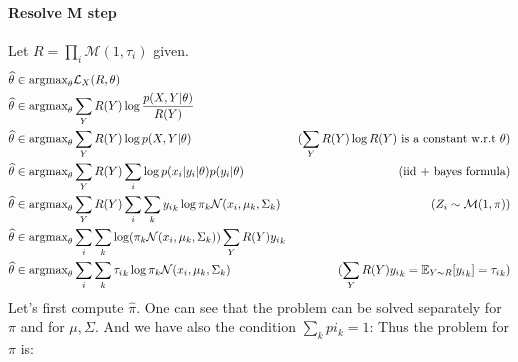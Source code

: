 \documentclass{article}
\begin{document}
\paragraph{Resolve M step} Let $R = \prod_i \mathcal{M}(1, \tau_i)$ given.\vspace{10px}
\begin{equation*}
    \begin{aligned}
        \widehat\theta & \in \text{argmax}_{\theta} \mathcal{L}_X(R, \theta)                                                      &                                                              \\
        \widehat\theta & \in \text{argmax}_{\theta} \sum_Y R(Y) \log \frac{p(X, Y | \theta)}{R(Y)}                                &                                                              \\
        \widehat\theta & \in \text{argmax}_{\theta} \sum_Y R(Y) \log p(X, Y | \theta)                                             & (\sum_{Y} R(Y) \log R(Y) \text{ is a constant w.r.t }\theta) \\
        \widehat\theta & \in \text{argmax}_\theta \sum_Y R(Y) \sum_i \log p(x_i | y_i | \theta) p(y_i|\theta)                     & \text{(iid + bayes formula)}                                 \\
        \widehat\theta & \in \text{argmax}_\theta \sum_Y R(Y) \sum_i \sum_k {y_i}_k \log \pi_k \mathcal{N}(x_i, \mu_k, \Sigma_k)  & (Z_i \sim \mathcal{M}(1, \pi))                               \\
        \widehat\theta & \in \text{argmax}_\theta \sum_i \sum_k \log (\pi_k\mathcal{N}(x_i, \mu_k, \Sigma_k)) \sum_Y R(Y) {y_i}_k &                                                              \\
        \widehat\theta & \in \text{argmax}_\theta \sum_i \sum_k {\tau_i}_k \log \pi_k \mathcal{N}(x_i, \mu_k, \Sigma_k)           & (\sum_Y R(Y) {y_i}_k = \mathbb{E}_{Y \sim R}[{y_i}_k] = {\tau_i}_k)
    \end{aligned}
\end{equation*}
Let's first compute $\widehat\pi$. One can see that the problem can be solved separately for $\pi$ and for $\mu, \Sigma$.
And we have also the condition $\sum_k pi_k = 1$: Thus the problem for $\pi$ is:
\end{document}
